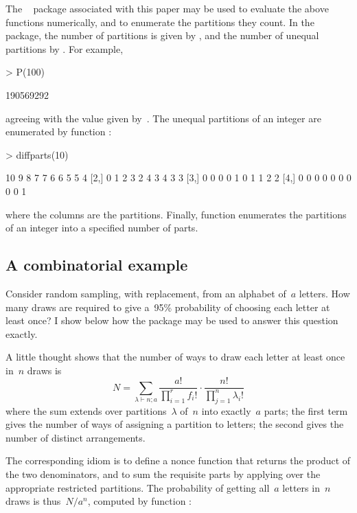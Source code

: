 \documentclass[nojss]{jss}
\begin{document}
The ~\citep{rmanual} package  associated
with this paper may be used to evaluate the above functions
numerically, and to enumerate the partitions they count.  In the
package, the number of partitions is given by , and the
number of unequal partitions by .  For example,
\begin{Schunk}
\begin{Sinput}
> P(100)
\end{Sinput}
\begin{Soutput}
[1] 190569292
\end{Soutput}
\end{Schunk}
agreeing with the value given by~\citet{abramowitz1965}.  The unequal
partitions of an integer are enumerated by function :
\begin{Schunk}
\begin{Sinput}
> diffparts(10)
\end{Sinput}
\begin{Soutput}
[1,] 10 9 8 7 7 6 6 5 5 4
[2,]  0 1 2 3 2 4 3 4 3 3
[3,]  0 0 0 0 1 0 1 1 2 2
[4,]  0 0 0 0 0 0 0 0 0 1
\end{Soutput}
\end{Schunk}
where the columns are the partitions.  Finally, function
 enumerates the partitions of an integer
into a specified number of parts.

\subsection{A combinatorial example}

Consider random sampling, with replacement, from an alphabet of~$a$
letters.  How many draws are required to give a~95\% probability of
choosing each letter at least once?  I show below how the
 package may be used to answer this question exactly.

A little thought shows that the number of ways to draw each letter at
least once in~$n$ draws is
\begin{equation}
N=
\sum_{\lambda\vdash n;a}
\frac{a!}{\prod_{i=1}^{r} f_i!}\cdot
\frac{n!}{\prod_{j=1}^{n}\lambda_i!}
\end{equation}
where the sum extends over partitions~$\lambda$ of~$n$ into
exactly~$a$ parts; the first term gives the number of ways of
assigning a partition to letters; the second gives the number of
distinct arrangements.

The corresponding  idiom is to define a nonce function
 that returns the product of the two denominators, and to
sum the requisite parts by applying  over the appropriate
restricted partitions.  The probability of getting all~$a$ letters
in~$n$ draws is thus~$N/a^n$, computed by function :
\end{document}
